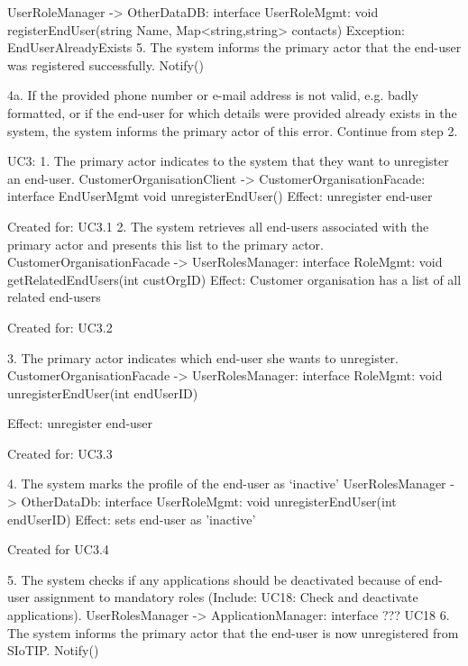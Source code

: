                 UserRoleManager -> OtherDataDB: interface UserRoleMgmt:
                                    void registerEndUser(string Name, Map<string,string> contacts)
                Exception: EndUserAlreadyExists
        5. The system informs the primary actor that the end-user was registered successfully.
                Notify()
        
        4a. If the provided phone number or e-mail address is not valid, e.g. badly formatted, or if the
            end-user for which details were provided already exists in the system, the system informs the
            primary actor of this error. Continue from step 2.
        
    UC3: 
        1. The primary actor indicates to the system that they want to unregister an end-user.
            CustomerOrganisationClient -> CustomerOrganisationFacade: interface EndUserMgmt
                                            void unregisterEndUser()
            Effect: unregister end-user
            \item Created for: UC3.1
        2. The system retrieves all end-users associated with the primary actor and presents this list to
            the primary actor.
            CustomerOrganisationFacade -> UserRolesManager: interface RoleMgmt:
                                                void getRelatedEndUsers(int custOrgID)
            Effect: Customer organisation has a list of all related end-users
            \item Created for: UC3.2
            
        3. The primary actor indicates which end-user she wants to unregister.
             CustomerOrganisationFacade -> UserRolesManager: interface RoleMgmt:
                                                void unregisterEndUser(int endUserID)
            
            Effect: unregister end-user
            \item Created for: UC3.3
              
        4. The system marks the profile of the end-user as `inactive'
            UserRolesManager -> OtherDataDb: interface UserRoleMgmt:
                                                void unregisterEndUser(int endUserID)
            Effect: sets end-user as 'inactive' 
            \item Created for UC3.4
               
        5. The system checks if any applications should be deactivated because of end-user assignment
            to mandatory roles (Include: UC18: Check and deactivate applications).
            UserRolesManager -> ApplicationManager: interface ??? UC18
        6. The system informs the primary actor that the end-user is now unregistered from SIoTIP.
            Notify()
            
